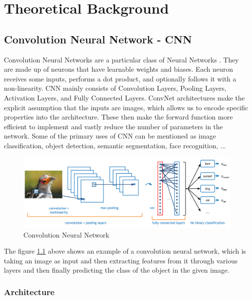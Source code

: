 \chapter{Theoretical Background}

\section{Convolution Neural Network - CNN}

Convolution Neural Networks are a particular class of Neural Networks \cite{masood2018real}. They are made up of neurons that have learnable weights and biases. Each neuron receives some inputs, performs a dot product, and optionally follows it with a non-linearity. CNN mainly consists of Convolution Layers, Pooling Layers, Activation Layers, and Fully Connected Layers. ConvNet architectures make the explicit assumption that the inputs are images, which allows us to encode specific properties into the architecture. These then make the forward function more efficient to implement and vastly reduce the number of parameters in the network. Some of the primary uses of CNN can be mentioned as image classification, object detection, semantic segmentation, face recognition, ...

\begin{figure}[H]
	\centering
	\includegraphics[width=\textwidth]{img/Chap3/Cover.png}
	\caption{Convolution Neural Network}
	\label{fig:Chap3-OverviewTheCNN}
\end{figure}

The figure \ref{fig:Chap3-OverviewTheCNN} above shows an example of a convolution neural network, which is taking an image as input and then extracting features from it through various layers and then finally predicting the class of the object in the given image.

\subsection{Architecture}

